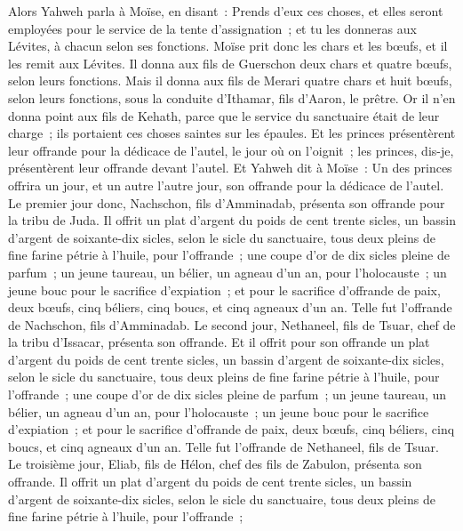 \begin{multicols}{2}
Alors Yahweh parla à Moïse, en disant~:
Prends d'eux ces choses, et elles seront employées pour le service de la tente d'assignation~; et tu les donneras aux Lévites, à chacun selon ses fonctions.
Moïse prit donc les chars et les bœufs, et il les remit aux Lévites.
Il donna aux fils de Guerschon deux chars et quatre bœufs, selon leurs fonctions.
Mais il donna aux fils de Merari quatre chars et huit bœufs, selon leurs fonctions, sous la conduite d'Ithamar, fils d'Aaron, le prêtre.
Or il n'en donna point aux fils de Kehath, parce que le service du sanctuaire était de leur charge~; ils portaient ces choses saintes sur les épaules.
Et les princes présentèrent leur offrande pour la dédicace de l'autel, le jour où on l'oignit~; les princes, dis-je, présentèrent leur offrande devant l'autel.
Et Yahweh dit à Moïse~: Un des princes offrira un jour, et un autre l'autre jour, son offrande pour la dédicace de l'autel.
Le premier jour donc, Nachschon, fils d'Amminadab, présenta son offrande pour la tribu de Juda.
Il offrit un plat d'argent du poids de cent trente sicles, un bassin d'argent de soixante-dix sicles, selon le sicle du sanctuaire, tous deux pleins de fine farine pétrie à l'huile, pour l'offrande~;
une coupe d'or de dix sicles pleine de parfum~;
un jeune taureau, un bélier, un agneau d'un an, pour l'holocauste~;
un jeune bouc pour le sacrifice d'expiation~;
et pour le sacrifice d'offrande de paix, deux bœufs, cinq béliers, cinq boucs, et cinq agneaux d'un an. Telle fut l'offrande de Nachschon, fils d'Amminadab.
Le second jour, Nethaneel, fils de Tsuar, chef de la tribu d'Issacar, présenta son offrande.
Et il offrit pour son offrande un plat d'argent du poids de cent trente sicles, un bassin d'argent de soixante-dix sicles, selon le sicle du sanctuaire, tous deux pleins de fine farine pétrie à l'huile, pour l'offrande~;
une coupe d'or de dix sicles pleine de parfum~;
un jeune taureau, un bélier, un agneau d'un an, pour l'holocauste~;
un jeune bouc pour le sacrifice d'expiation~;
et pour le sacrifice d'offrande de paix, deux bœufs, cinq béliers, cinq boucs, et cinq agneaux d'un an. Telle fut l'offrande de Nethaneel, fils de Tsuar.
Le troisième jour, Eliab, fils de Hélon, chef des fils de Zabulon, présenta son offrande.
Il offrit un plat d'argent du poids de cent trente sicles, un bassin d'argent de soixante-dix sicles, selon le sicle du sanctuaire, tous deux pleins de fine farine pétrie à l'huile, pour l'offrande~;

\end{multicols}
